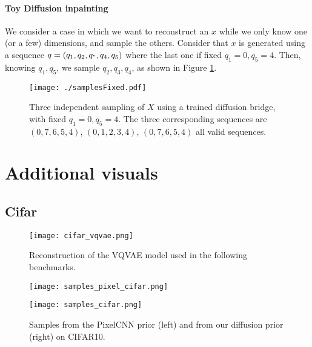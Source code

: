 \documentclass{article}
\theoremstyle{plain}
\theoremstyle{definition}
\theoremstyle{remark}
\begin{document}
\paragraph{Toy Diffusion inpainting}

\label{ap:toyinpainting}
We consider a case in which we want to reconstruct an $x$ while we only know one (or a few) dimensions, and sample the others. Consider that $x$ is generated using a sequence $q= (q_1,q_2,q_",q_4,q_5)$ where the last one if fixed $q_1 = 0, q_5 = 4$. Then, knowing $q_1, q_5$, we sample $q_2,q_3,q_4$, as shown in Figure \ref{fig:fixeddim}.
\begin{figure}[h!]
    \centering
    \texttt{[image: ./samplesFixed.pdf]}
    \caption{Three independent sampling of $X$ using a trained diffusion bridge, with fixed $q_1 = 0, q_5 = 4$. The three corresponding sequences are $(0,7,6,5,4)$, $(0,1,2,3,4)$, $(0,7,6,5,4)$ all valid sequences.}
    \label{fig:fixeddim}
\end{figure}

\clearpage
\newpage
 
\section{Additional visuals}\label{ap:additional_visuals}

\subsection{Cifar}

\begin{figure}[!htb]
    \centering
    \texttt{[image: cifar\_vqvae.png]}
    \caption{Reconstruction of the VQVAE model used in the following benchmarks.}
    \label{fig:cifar_vqvae}
\end{figure}

\begin{figure}[!htb]
    \centering
    \begin{minipage}[b]{0.4\textwidth}
    \texttt{[image: samples\_pixel\_cifar.png]}
    \end{minipage}
    \hfill
    \begin{minipage}[b]{0.4\textwidth}
    \texttt{[image: samples\_cifar.png]}
    \end{minipage}
        \caption{Samples from the PixelCNN prior (left) and from our diffusion prior (right) on CIFAR10.}

    \label{fig:cifar_priors}
\end{figure}
\end{document}
